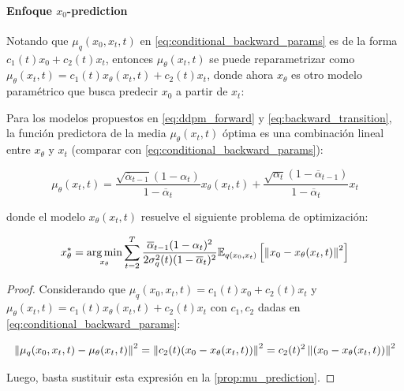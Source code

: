 \paragraph{Enfoque \texorpdfstring{$x_0$}{x0}-prediction}
Notando que $\mu_q(x_0,x_t,t)$ en \eqref{eq:conditional_backward_params} es de la forma $c_1(t)x_0 + c_2(t)x_t$, entonces $\mu_\theta(x_t,t)$ se puede reparametrizar como $\mu_\theta(x_t,t)=c_1(t)x_\theta(x_t,t) + c_2(t)x_t$, donde ahora $x_\theta$ es otro modelo paramétrico que busca predecir $x_0$ a partir de $x_t$:

\begin{prop}
    Para los modelos propuestos en \eqref{eq:ddpm_forward} y \eqref{eq:backward_transition}, la función predictora de la media $\mu_\theta(x_t,t)$ óptima es una combinación lineal entre $x_\theta$ y $x_t$ (comparar con \eqref{eq:conditional_backward_params}):

    \begin{equation}
        \mu_\theta(x_t,t) = \frac{\sqrt{\overline{\alpha}_{t-1}}(1-\alpha_t)}{1-\overline{\alpha}_t}x_\theta(x_t,t) + \frac{\sqrt{\alpha_t}(1-\overline{\alpha}_{t-1})}{1-\overline{\alpha}_t}x_t
    \end{equation}

    donde el modelo $x_\theta(x_t,t)$ resuelve el siguiente problema de optimización:

    \begin{equation}
        x_\theta^* = \operatorname*{arg\,min}_{x_\theta} \sum_{t=2}^T \frac{\overline{\alpha}_{t-1}(1-\alpha_t)^2}{2\sigma_q^2(t)(1-\overline{\alpha}_t)^2} \mathbb{E}_{q(x_0,x_t)}\left[\left\lVert x_0-x_\theta(x_t,t) \right\rVert^2\right]
    \end{equation}
\end{prop}

\begin{proof}
    Considerando que $\mu_q(x_0,x_t,t)=c_1(t)x_0 + c_2(t)x_t$ y $\mu_\theta(x_t,t)=c_1(t)x_\theta(x_t,t) + c_2(t)x_t$ con $c_1,c_2$ dadas en \eqref{eq:conditional_backward_params}:

    \begin{equation}
        \left\lVert \mu_q(x_0,x_t,t)-\mu_\theta(x_t,t) \right\rVert^2 = \left\lVert c_2(t)(x_0-x_\theta(x_t,t)) \right\rVert^2 = c_2(t)^2 \left\lVert (x_0-x_\theta(x_t,t)) \right\rVert^2
    \end{equation}

    Luego, basta sustituir esta expresión en la \autoref{prop:mu_prediction}.
\end{proof}

